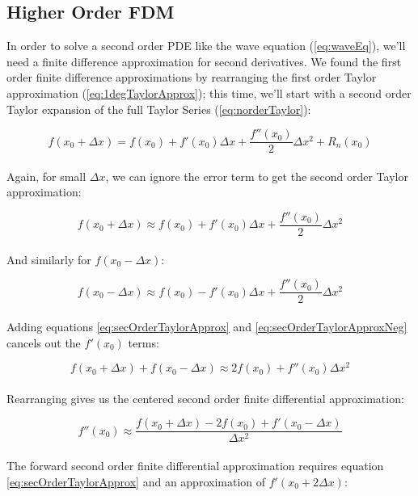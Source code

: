 {\subsection{Higher Order FDM}

In order to solve a second order PDE like the wave equation (\ref{eq:waveEq}), we'll need a finite difference approximation for second derivatives.  We found the first order finite difference approximations by rearranging the first order Taylor approximation (\ref{eq:1degTaylorApprox}); this time, we'll start with a second order Taylor expansion of the full Taylor Series (\ref{eq:norderTaylor}):

 \begin{equation}
  f(x_{0} + \Delta  x) = f(x_{0}) + f'(x_{0})\Delta  x + \frac{f''(x_{0})}{2}\Delta  x^{2} + R_{n}(x_{0})
  \end{equation}
    \\
  Again, for small $\Delta  x$, we can ignore the error term to get the second order Taylor approximation:
  
   \begin{equation}\label{eq:secOrderTaylorApprox}
  f(x_{0} + \Delta  x) \approx f(x_{0}) + f'(x_{0})\Delta  x + \frac{f''(x_{0})}{2}\Delta  x^{2}
  \end{equation}
    \\
  And similarly for  $f(x_{0} - \Delta  x)$:
  
     \begin{equation}\label{eq:secOrderTaylorApproxNeg}
  f(x_{0} - \Delta  x) \approx f(x_{0}) - f'(x_{0})\Delta  x + \frac{f''(x_{0})}{2}\Delta  x^{2}
  \end{equation}
    \\
  Adding equations \ref{eq:secOrderTaylorApprox} and \ref{eq:secOrderTaylorApproxNeg} cancels out the $f'(x_{0})$ terms:
  
   \begin{equation}
  f(x_{0} + \Delta  x) + f(x_{0} - \Delta  x) \approx 2f(x_{0}) + f''(x_{0})\Delta  x^{2}
  \end{equation}
    \\
  Rearranging gives us the centered second order finite differential approximation:
  
   \begin{equation}\label{eq:fdaseccentered}
   f''(x_{0}) \approx \frac{f(x_{0} + \Delta  x) - 2f(x_{0}) + f'(x_{0} -\Delta  x)}{\Delta  x^{2}}
  \end{equation}
    \\
  The forward second order finite differential approximation requires equation \ref{eq:secOrderTaylorApprox} and an approximation of $f'(x_{0} + 2\Delta  x)$:
  
}
